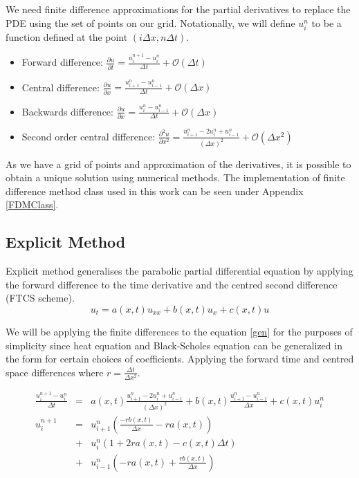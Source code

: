 \documentclass[12pt, oneside]{book}
\theoremstyle{plain}
\theoremstyle{definition}
\begin{document}
We need finite difference approximations for the partial derivatives to replace the PDE using the set of points on our grid. Notationally, we will define $u^n_i$ to be a function defined at the point $(i \Delta x, n \Delta t) $.

\begin{itemize}
        \item Forward difference: $ \frac{\partial u}{\partial t} = \frac{u^{n+1}_i - u^n_i}{\Delta t} + \mathcal{O}( \Delta t) $
        \item Central difference: $ \frac{\partial u}{\partial x} = \frac{u^n_{i+1} - u^n_{i-1}}{\Delta t}   + \mathcal{O}( \Delta x) $
        \item Backwards difference: $ \frac{\partial u}{\partial x} = \frac{u^{n}_i - u^n_{i - 1}}{\Delta t}  + \mathcal{O}( \Delta x) $
        \item Second order central difference: $ \frac{\partial^2 u}{\partial x^2} = \frac{u^n_{i+1}- 2u^n_i + u^n_{i-1}}{(\Delta x)^2}  + \mathcal{O}( \Delta x^2) $
\end{itemize}

As we have a grid of points and approximation of the derivatives, it is possible to obtain a unique solution using numerical methods. The implementation of finite difference method class used in this work can be seen under Appendix \ref{FDMClass}.

\subsection{Explicit Method}
Explicit method generalises the parabolic partial differential equation by applying the forward difference to the time derivative and the centred second difference (FTCS scheme).
\begin{equation} \label{gen}
 u_t = a(x, t)  u_{xx} + b(x, t) u_x + c(x, t) u
\end{equation}

We will be applying the finite differences to the equation  \ref{gen}  for the purposes of simplicity since heat equation and Black-Scholes equation can be generalized in the form for certain choices of coefficients. Applying the forward time and centred space differences where $ r = \frac{\Delta t}{\Delta x^2} $.

\begin{eqnarray*}
\frac{u^{n+1}_i - u^n_i}{\Delta t} &=& a(x, t)  \frac{u^n_{i+1}- 2u^n_i + u^n_{i-1}}{(\Delta x)^2}  + b(x, t)  \frac{u^{n}_{i+1} - u^{n}_{i-1}}{\Delta x} + c(x, t) u^n_i \\
u^{n+1}_i &=& u^n_{i + 1} (\frac{-r b(x, t)}{\Delta x} - r a(x, t))\\
&+& u^n_{i}(1 + 2 r a(x, t) - c(x, t) \Delta t) \\
&+& u^n_{i - 1} (-r a(x, t) + \frac{r b(x, t)}{\Delta x})
\end{eqnarray*}
\end{document}

